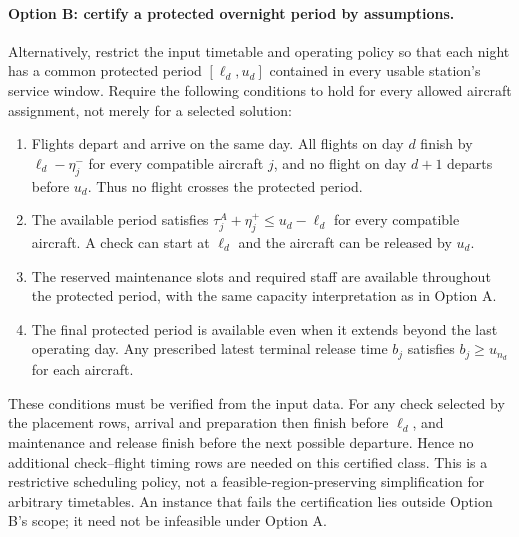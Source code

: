\paragraph{Option B: certify a protected overnight period by assumptions.}
Alternatively, restrict the input timetable and operating policy so that
each night has a common protected period $[\ell_d,u_d]$ contained in every
usable station's service window. Require the following conditions to hold
for every allowed aircraft assignment, not merely for a selected solution:
\begin{enumerate}
\item Flights depart and arrive on the same day. All flights on day $d$
  finish by $\ell_d-\eta^-_j$ for every compatible aircraft $j$, and no
  flight on day $d+1$ departs before $u_d$. Thus no flight crosses the
  protected period.
\item The available period satisfies
  $\tau^A_j+\eta^+_j\le u_d-\ell_d$ for every compatible aircraft.
  A check can start at $\ell_d$ and the aircraft can be released by $u_d$.
\item The reserved maintenance slots and required staff are available
  throughout the protected period, with the same capacity interpretation
  as in Option A.
\item The final protected period is available even when it extends beyond
  the last operating day. Any prescribed latest terminal release time
  $b_j$ satisfies $b_j\ge u_{n_d}$ for each aircraft.
\end{enumerate}
These conditions must be verified from the input data. For any check
selected by the placement rows, arrival and preparation then finish before
$\ell_d$, and maintenance and release finish before the next possible
departure. Hence no additional check--flight timing rows are needed on this
certified class. This is a restrictive scheduling policy, not a
feasible-region-preserving simplification for arbitrary timetables. An
instance that fails the certification lies outside Option B's scope; it
need not be infeasible under Option A.

